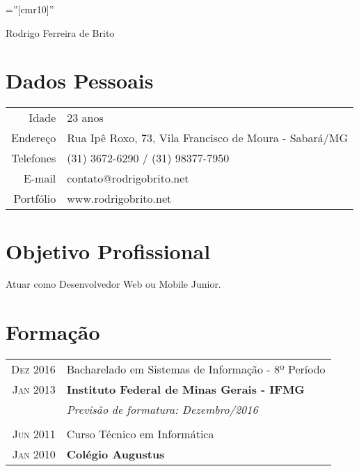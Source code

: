 \documentclass[a4paper,10pt]{article}
\begin{document}
\pagestyle{empty} %

\font\fb=''[cmr10]'' %

\vspace*{-1cm}
\par{\centering
	{\Huge Rodrigo Ferreira de Brito
}\bigskip\par}

\section{Dados Pessoais}

\begin{tabular}{rl}
Idade & 23 anos\\
Endereço & Rua Ipê Roxo, 73, Vila Francisco de Moura - Sabará/MG\\    
Telefones & (31) 3672-6290 / (31) 98377-7950\\
E-mail & contato@rodrigobrito.net\\
Portfólio & www.rodrigobrito.net\\
\end{tabular}

\section{Objetivo Profissional}

Atuar como Desenvolvedor Web ou Mobile Junior.

\section{Formação}
\begin{tabular}{r|p{13.1cm}}
	\textsc{Dez 2016} & Bacharelado em Sistemas de Informação - 8º Período\\
	\textsc{Jan 2013} & \textbf{Instituto Federal de Minas Gerais - IFMG}\\
	&\small\emph{Previsão de formatura: Dezembro/2016}\\
	\multicolumn{2}{c}{} \\
	\textsc{Jun 2011}& Curso Técnico em Informática \\
	\textsc{Jan 2010}& \textbf{Colégio Augustus}
\end{tabular}
\end{document}
